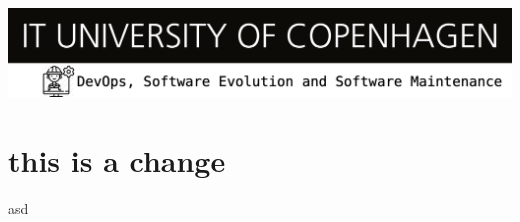 \documentclass{article}
\begin{document}
  \includegraphics[width=1\linewidth]{images/devops-banner.png}
  \section{this is a change}
  asd
  
\end{document}

